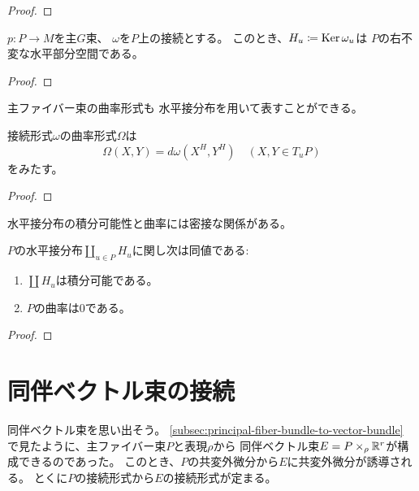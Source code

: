 \documentclass[report]{jlreq}
\begin{document}
\begin{proof}
\end{proof}

\begin{theorem}[接続から水平接分布へ]
    $p \colon P \to M$を主$G$束、
    $\omega$を$P$上の接続とする。
    このとき、$H_u \coloneqq \operatorname{\mathrm{Ker}} \omega_u$は
    $P$の右不変な水平部分空間である。
\end{theorem}

\begin{proof}
\end{proof}

主ファイバー束の曲率形式も
水平接分布を用いて表すことができる。

\begin{proposition}
    接続形式$\omega$の曲率形式$\Omega$は
    \begin{equation}
        \Omega(X, Y) = d\omega(X^H, Y^H)
            \quad
            (X, Y \in T_uP)
    \end{equation}
    をみたす。
\end{proposition}

\begin{proof}
    \TODO{}
\end{proof}

水平接分布の積分可能性と曲率には密接な関係がある。

\begin{theorem}[水平接分布の積分可能性]
    $P$の水平接分布$\coprod_{u \in P} H_u$に関し次は同値である:
    \begin{enumerate}
        \item $\coprod H_u$は積分可能である。
        \item $P$の曲率は$0$である。
    \end{enumerate}
\end{theorem}

\begin{proof}
    \TODO{}
\end{proof}


%
\section{同伴ベクトル束の接続}

同伴ベクトル束を思い出そう。
\cref{subsec:principal-fiber-bundle-to-vector-bundle}
で見たように、主ファイバー束$P$と表現$\rho$から
同伴ベクトル束$E = P \times_\rho \mathbb{R}^r$が構成できるのであった。
このとき、$P$の共変外微分から$E$に共変外微分が誘導される。
とくに$P$の接続形式から$E$の接続形式が定まる。
\end{document}
